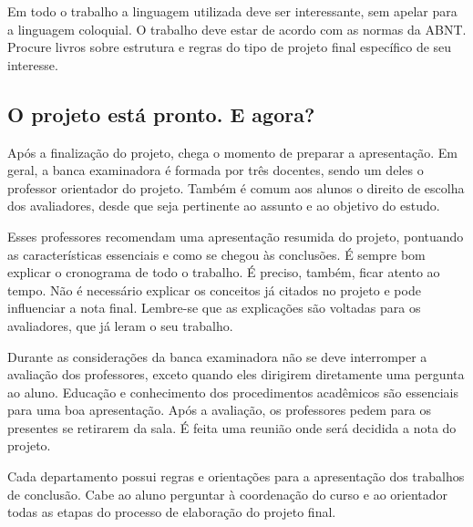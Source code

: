 Em todo o trabalho a linguagem utilizada deve ser interessante, sem apelar para a linguagem coloquial. O trabalho deve estar de acordo com as normas da ABNT. Procure livros sobre estrutura e regras do tipo de projeto final específico de seu interesse.

\subsection{O projeto está pronto. E agora?}
Após a finalização do projeto, chega o momento de preparar a apresentação. Em geral, a banca examinadora é formada por três docentes, sendo um deles o professor orientador do projeto. Também é comum aos alunos o direito de escolha dos avaliadores, desde que seja pertinente ao assunto e ao objetivo do estudo.

Esses professores recomendam uma apresentação resumida do projeto, pontuando as características essenciais e como se chegou às conclusões. É sempre bom explicar o cronograma de todo o trabalho. É preciso, também, ficar atento ao tempo. Não é necessário explicar os conceitos já citados no projeto e pode influenciar a nota final. Lembre-se que as explicações são voltadas para os avaliadores, que já leram o seu trabalho.

Durante as considerações da banca examinadora não se deve interromper a avaliação dos professores, exceto quando eles dirigirem diretamente uma pergunta ao aluno. Educação e conhecimento dos procedimentos acadêmicos são essenciais para uma boa apresentação. Após a avaliação, os professores pedem para os presentes se retirarem da sala. É feita uma reunião onde será decidida a nota do projeto.

Cada departamento possui regras e orientações para a apresentação dos trabalhos de conclusão. Cabe ao aluno perguntar à coordenação do curso e ao orientador todas as etapas do processo de elaboração do projeto final.

\selectfont%
